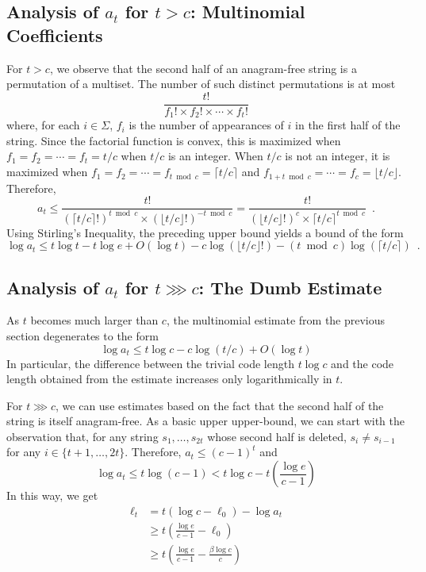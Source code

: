 \documentclass{patmorin}
\newcommand{\ceil}[1]{\lceil #1\rceil}
\newcommand{\floor}[1]{\lfloor #1\rfloor}
\begin{document}
\subsection{Analysis of $a_t$ for $t > c$: Multinomial Coefficients}

For $t>c$, we observe that the second half of an anagram-free string is a permutation of a multiset.  The number of such distinct permutations is at most
\[
    \frac{t!}{f_1!\times f_2!\times \cdots\times f_t!}
\]
where, for each $i\in\Sigma$, $f_i$ is the number of appearances of $i$ in the first half of the string.  Since the factorial function is convex, this is maximized when $f_1=f_2=\cdots=f_t=t/c$ when $t/c$ is an integer.  When $t/c$ is not an integer, it is maximized when $f_1=f_2=\cdots=f_{t\bmod c}=\ceil{t/c}$ and $f_{1+t\bmod c}=\cdots=f_c=\floor{t/c}$.  Therefore,
\[
    a_t \le \frac{t!}{(\ceil{t/c}!)^{t\bmod c}\times (\floor{t/c}!)^{-t\bmod c}}
    = \frac{t!}{(\floor{t/c}!)^c\times \ceil{t/c}^{t\bmod c}} \enspace .
\]
Using Stirling's Inequality, the preceding upper bound yields a bound of the form
\[
   \log a_t \le t\log t - t\log e + O(\log t) - c\log(\floor{t/c}!) - (t\bmod c)\log(\ceil{t/c}) \enspace .
\]

\subsection{Analysis of $a_t$ for $t\ggg c$: The Dumb Estimate}

As $t$ becomes much larger than $c$, the multinomial estimate from the previous section degenerates to the form
\[
   \log a_t \le t\log c - c\log(t/c) + O(\log t)
\]
In particular, the difference between the trivial code length $t\log c$ and the code length obtained from the estimate increases only logarithmically in $t$.

For $t\ggg c$, we can use estimates based on the fact that the second half of the string is itself anagram-free.  As a basic upper upper-bound, we can start with the observation that, for any string $s_1,\ldots,s_{2t}$ whose second half is deleted, $s_{i}\neq s_{i-1}$ for any $i\in\{t+1,\ldots,2t\}$.  Therefore,
$a_t \le (c-1)^t$ and
\[
     \log a_t \le t\log(c-1) < t\log c - t\left(\frac{\log e}{c-1}\right)
\]
In this way, we get
\begin{align*}
    \ell_t & = t(\log c - \ell_0) - \log a_t \\
        & \ge t\left(\frac{\log e}{c-1}-\ell_0\right) \\
        & \ge t\left(\frac{\log e}{c-1}-\frac{\beta\log c}{c}\right) 
\end{align*}
\end{document}
